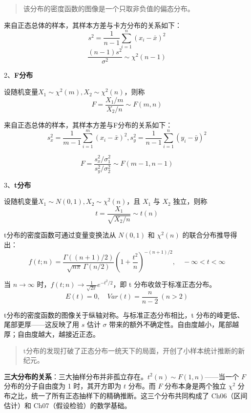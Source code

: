 \documentclass[
]{book}
\begin{document}
\begin{quote}
该分布的密度函数的图像是一个只取非负值的偏态分布。
\end{quote}

来自正态总体的样本，其样本方差与卡方分布的关系如下：
\[
s^2=\frac{1}{n-1}\sum_{i=1}^n(x_i-\bar{x})^2
\]
\[
\frac{(n-1)s^2}{\sigma^2}\sim \chi^2(n-1)
\]

2、\textbf{F分布}

设随机变量\(X_1\sim\chi^2(m),X_2\sim\chi^2(n)\)，则称
\[
F=\frac{X_1/m}{X_2/n}\sim F(m,n)
\]

来自正态总体的样本，其样本方差与F分布的关系如下：
\[
s_x^2=\frac{1}{m-1}\sum_{i=1}^m(x_i-\bar{x})^2,s_y^2=\frac{1}{n-1}\sum_{i=1}^n(y_i-\bar{y})^2
\]

\[
F=\frac{s_x^2/\sigma_1^2}{s_y^2/\sigma_2^2}\sim F(m-1,n-1)
\]

3、\textbf{t分布}

设随机变量\(X_1\sim N(0,1),X_2\sim\chi^2(n)\)，且 \(X_1\) 与 \(X_2\) 独立，则称
\[
t=\frac{X_1}{\sqrt{X_2/n}}\sim t(n)
\]

t分布的密度函数可通过变量变换法从 \(N(0,1)\) 和 \(\chi^2(n)\) 的联合分布推导得出：
\[
f(t;n)=\frac{\Gamma((n+1)/2)}{\sqrt{n\pi}\,\Gamma(n/2)}\left(1+\frac{t^2}{n}\right)^{-(n+1)/2},\quad -\infty<t<\infty
\]

当 \(n\to\infty\) 时，\(f(t;n)\to \frac{1}{\sqrt{2\pi}}e^{-t^2/2}\)，即 t 分布收敛于标准正态分布。
\[
E(t)=0,\quad Var(t)=\frac{n}{n-2}\ (n>2)
\]

t分布的密度函数的图像关于纵轴对称。与标准正态分布相比，t 分布的峰更低、尾部更厚------这反映了用 \(s\) 估计 \(\sigma\) 带来的额外不确定性。自由度越小，尾部越厚；自由度越大，越接近正态。

\begin{quote}
t分布的发现打破了正态分布一统天下的局面，开创了小样本统计推断的新纪元。
\end{quote}

\textbf{三大分布的关系}：三大抽样分布并非孤立存在。\(t^2(n) \sim F(1,n)\)------当一个 \(F\) 分布的分子自由度为 1 时，其开方即为 \(t\) 分布。而 \(F\) 分布本身是两个独立 \(\chi^2\) 分布之比，统一了所有正态抽样下的精确推断。这三个分布共同构成了 Ch06（区间估计）和 Ch07（假设检验）的数学基础。
\end{document}
